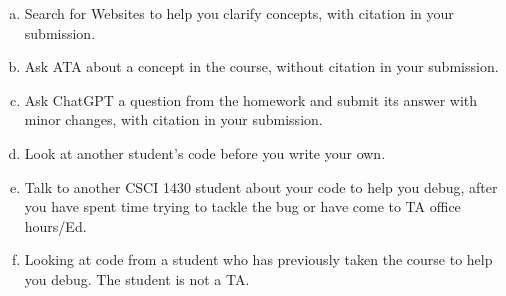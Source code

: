 \documentclass{csci1430}
\begin{document}
\begin{enumerate}[(a)]
\item
Search for Websites to help you clarify concepts, with citation in your submission.


\item 
Ask ATA about a concept in the course, without citation in your submission.


\item 
Ask ChatGPT a question from the homework and submit its answer with minor changes, with citation in your submission.


\item 
Look at another student's code before you write your own.


\item
Talk to another CSCI 1430 student about your code to help you debug, after you have spent time trying to tackle the bug or have come to TA office hours/Ed.


\item
Looking at code from a student who has previously taken the course to help you debug. The student is not a TA.


\end{enumerate}
\end{document}
